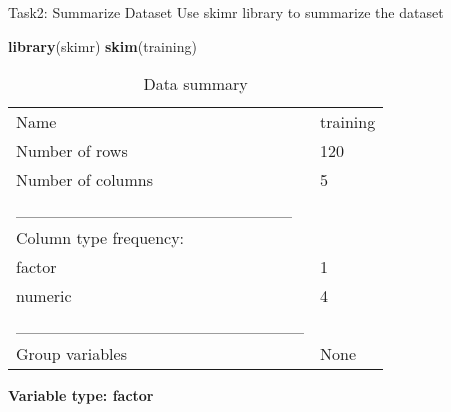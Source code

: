 \documentclass[
]{article}
\newenvironment{Shaded}{\begin{snugshade}}{\end{snugshade}}
\newcommand{\AttributeTok}[1]{\textcolor[rgb]{0.13,0.29,0.53}{#1}}
\newcommand{\ConstantTok}[1]{\textcolor[rgb]{0.56,0.35,0.01}{#1}}
\newcommand{\DecValTok}[1]{\textcolor[rgb]{0.00,0.00,0.81}{#1}}
\newcommand{\FloatTok}[1]{\textcolor[rgb]{0.00,0.00,0.81}{#1}}
\newcommand{\FunctionTok}[1]{\textcolor[rgb]{0.13,0.29,0.53}{\textbf{#1}}}
\newcommand{\NormalTok}[1]{#1}
\newcommand{\OtherTok}[1]{\textcolor[rgb]{0.56,0.35,0.01}{#1}}
\newcommand{\SpecialCharTok}[1]{\textcolor[rgb]{0.81,0.36,0.00}{\textbf{#1}}}
\begin{document}
\begin{Shaded}
\end{Shaded}

Task2: Summarize Dataset Use skimr library to summarize the dataset

\begin{Shaded}
\begin{Highlighting}[]
\FunctionTok{library}\NormalTok{(skimr)}
\FunctionTok{skim}\NormalTok{(training)}
\end{Highlighting}
\end{Shaded}

\begin{longtable}[]{@{}ll@{}}
\caption{Data summary}\tabularnewline
\toprule\noalign{}
\endfirsthead
\endhead
\bottomrule\noalign{}
\endlastfoot
Name & training \\
Number of rows & 120 \\
Number of columns & 5 \\
\_\_\_\_\_\_\_\_\_\_\_\_\_\_\_\_\_\_\_\_\_\_\_ & \\
Column type frequency: & \\
factor & 1 \\
numeric & 4 \\
\_\_\_\_\_\_\_\_\_\_\_\_\_\_\_\_\_\_\_\_\_\_\_\_ & \\
Group variables & None \\
\end{longtable}

\textbf{Variable type: factor}
\end{document}
